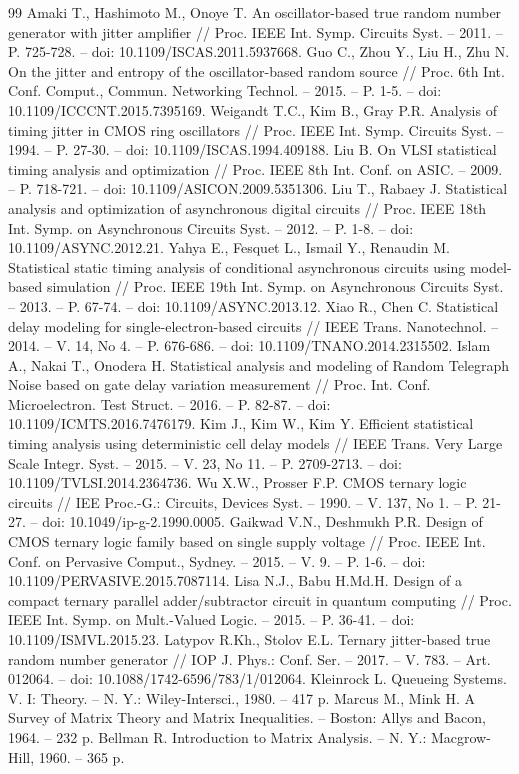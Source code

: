 \documentclass[a4paper,12pt]{article}
\begin{document}
\begin{thebibliography}{99}
 Amaki T., Hashimoto M., Onoye T. An oscillator-based true random number generator with jitter amplifier // Proc. IEEE Int. Symp. Circuits Syst. -- 2011. -- P. 725-728. -- doi: 10.1109/ISCAS.2011.5937668.
 Guo C., Zhou Y., Liu H., Zhu N. On the jitter and entropy of the oscillator-based random source // Proc. 6th Int. Conf. Comput., Commun. Networking Technol. -- 2015. -- P. 1-5. -- doi: 10.1109/ICCCNT.2015.7395169.
 Weigandt T.C., Kim B., Gray P.R. Analysis of timing jitter in CMOS ring oscillators // Proc. IEEE Int. Symp. Circuits Syst. -- 1994. -- P. 27-30. -- doi: 10.1109/ISCAS.1994.409188.
 Liu B. On VLSI statistical timing analysis and optimization // Proc. IEEE 8th Int. Conf. on ASIC. -- 2009. -- P. 718-721. -- doi: 10.1109/ASICON.2009.5351306.
 Liu T., Rabaey J. Statistical analysis and optimization of asynchronous digital circuits // Proc. IEEE 18th Int. Symp. on Asynchronous Circuits Syst. -- 2012. -- P. 1-8. -- doi: 10.1109/ASYNC.2012.21.
 Yahya E., Fesquet L., Ismail Y., Renaudin M. Statistical static timing analysis of conditional asynchronous circuits using model-based simulation // Proc. IEEE 19th Int. Symp. on Asynchronous Circuits Syst. -- 2013. -- P. 67-74. -- doi: 10.1109/ASYNC.2013.12.
 Xiao R., Chen C. Statistical delay modeling for single-electron-based circuits // IEEE Trans. Nanotechnol. -- 2014. -- V. 14, No 4. -- P. 676-686. -- doi: 10.1109/TNANO.2014.2315502.
 Islam A., Nakai T., Onodera H. Statistical analysis and modeling of Random Telegraph Noise based on gate delay variation measurement // Proc. Int. Conf. Microelectron. Test Struct. -- 2016. -- P. 82-87. -- doi: 10.1109/ICMTS.2016.7476179.
 Kim J., Kim W., Kim Y. Efficient statistical timing analysis using deterministic cell delay models // IEEE Trans. Very Large Scale Integr. Syst. -- 2015. -- V. 23, No 11. -- P. 2709-2713. -- doi: 10.1109/TVLSI.2014.2364736.
 Wu X.W., Prosser F.P. CMOS ternary logic circuits // IEE Proc.-G.: Circuits, Devices Syst. -- 1990. -- V. 137, No 1. -- P. 21-27. -- doi: 10.1049/ip-g-2.1990.0005.
 Gaikwad V.N., Deshmukh P.R. Design of CMOS ternary logic family based on single supply voltage // Proc. IEEE Int. Conf. on Pervasive Comput., Sydney. -- 2015. -- V. 9. -- P. 1-6. -- doi: 10.1109/PERVASIVE.2015.7087114.
 Lisa N.J., Babu H.Md.H. Design of a compact ternary parallel adder/subtractor circuit in quantum computing // Proc. IEEE Int. Symp. on Mult.-Valued Logic. -- 2015. -- P. 36-41. -- doi: 10.1109/ISMVL.2015.23.
 Latypov R.Kh., Stolov E.L. Ternary jitter-based true random number generator // IOP J. Phys.: Conf. Ser. -- 2017. -- V. 783. -- Art. 012064. -- doi: 10.1088/1742-6596/783/1/012064.
 Kleinrock L. Queueing Systems. V. I: Theory. -- N. Y.: Wiley-Intersci., 1980. -- 417 p.
 Marcus M., Mink H. A Survey of Matrix Theory and Matrix Inequalities. -- Boston: Allys and Bacon, 1964. -- 232 p.
 Bellman R. Introduction to Matrix Analysis. -- N. Y.: Macgrow-Hill, 1960. -- 365 p.
\end{thebibliography}
\end{document}
